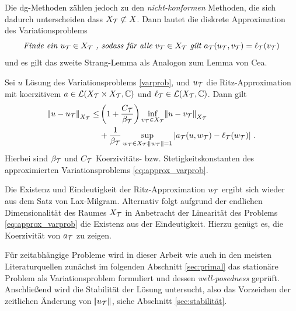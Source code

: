 Die \ac{dg}-Methoden zählen jedoch zu den \emph{nicht-konformen} Methoden, die sich dadurch unterscheiden dass $X_{\mathcal{T}}\not\subset X$. Dann lautet die diskrete Approximation des Variationsproblems
\begin{equation}
  \emph{Finde ein } u_{\mathcal{T}}\in X_{\mathcal{T}}\emph{ , sodass für alle } v_{\mathcal{T}}\in X_{\mathcal{T}} \emph{ gilt } a_{\mathcal{T}}(u_{\mathcal{T}}, v_{\mathcal{T}}) = \ell_{\mathcal{T}}(v_{\mathcal{T}})
  \label{eq:approx_varprob}
\end{equation}
und es gilt das zweite Strang-Lemma als Analogon zum Lemma von Cea.
\begin{satz}\label{strang}
  Sei $u$ Lösung des Variationsproblems \ref{varprob}, und $u_{\mathcal{T}}$ die Ritz-Approximation mit koerzitivem $a \in \mathcal{L}(X_{\mathcal{T}} \times X_{\mathcal{T}}, \mathbb{C})$ und $\ell_{\mathcal{T}} \in \mathcal{L}(X_{\mathcal{T}}, \mathbb{C})$. Dann gilt
  \begin{equation}
    \begin{aligned}
    \norm{u-u_{\mathcal{T}}}_{X_{\mathcal{T}}} \leq &\left(1 +\frac{C_{\mathcal{T}}}{\beta_{\mathcal{T}}}\right) \inf_{v_{\mathcal{T}} \in X_{\mathcal{T}}}\norm{u-v_{\mathcal{T}}}_{X_{\mathcal{T}}} \\
    & +\frac{1}{\beta_{\mathcal{T}}} \sup_{w_{\mathcal{T}} \in X_{\mathcal{T}}: \norm{w_{\mathcal{T}}}=1} |a_{\mathcal{T}}(u,w_{\mathcal{T}})-\ell_{\mathcal{T}}(w_{\mathcal{T}})| \; .
  \end{aligned}
  \end{equation}
  Hierbei sind $\beta_{\mathcal{T}}$ und $C_{\mathcal{T}}$ Koerzivitäts- bzw. Stetigkeitskonstanten des approximierten Variationsproblems \ref{eq:approx_varprob}.
\end{satz}
Die Existenz und Eindeutigkeit der Ritz-Approximation $u_{\mathcal{T}}$ ergibt sich wieder aus dem Satz von Lax-Milgram. Alternativ folgt aufgrund der endlichen Dimensionalität des Raumes $X_{\mathcal{T}}$ in Anbetracht der Linearität des Problems \eqref{eq:approx_varprob} die Existenz aus der Eindeutigkeit. Hierzu genügt es, die Koerzivität von $a_{\mathcal{T}}$ zu zeigen.

Für zeitabhängige Probleme wird in dieser Arbeit wie auch in den meisten Literaturquellen \cite{NLS} zunächst im folgenden Abschnitt \ref{sec:primal} das stationäre Problem als Variationsproblem formuliert und dessen \emph{well-posedness} geprüft. Anschließend wird die Stabilität der Lösung untersucht, also das Vorzeichen der zeitlichen Änderung von $\norm{u_{\mathcal{T}}}$, siehe Abschnitt \ref{sec:stabilität}.


